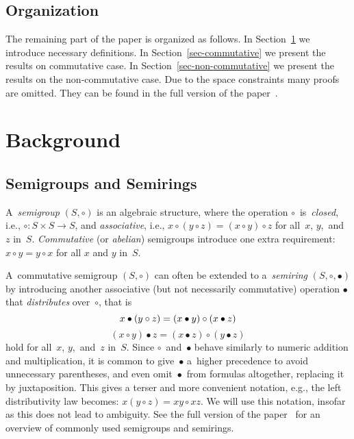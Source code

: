 \documentclass[review,onefignum,onetabnum]{siamart190516}
\begin{document}
\subsection{Organization}

The remaining part of the paper is organized as follows. In Section~\ref{sec:background} we introduce necessary definitions. In Section~\ref{sec-commutative} we present the results on commutative case. In Section~\ref{sec-non-commutative} we present the results on the non-commutative case. Due to the space constraints many proofs are omitted. They can be found in the full version of the
paper~\cite{DBLP:journals/eccc/KulikovMMP19}.


\section{Background} \label{sec:background}
\subsection{Semigroups and Semirings}
A~\emph{semigroup} $(S, \circ)$ is an algebraic structure, where
the operation
$\circ$~is~\emph{closed}, i.e., $\circ : S\times S \rightarrow S$,
and
\emph{associative}, i.e.,
$x \circ (y \circ z) = (x \circ y) \circ z$ for all~$x$, $y$,~and~$z$
in~$S$.
\emph{Commutative} (or \emph{abelian}) semigroups introduce
one extra requirement: $x \circ y = y \circ x$ for all $x$ and $y$
in~$S$.

A~commutative semigroup $(S, \circ)$ can often be extended to
a~\emph{semiring} $(S, \circ, \bullet)$ by introducing
another associative (but not necessarily
commutative)
operation $\bullet$ that \emph{distributes} over~$\circ$, that is
\[
x \bullet (y \circ z) = (x \bullet y) \circ (x \bullet z)\\
\]
\[
(x \circ y) \bullet z = (x \bullet z) \circ (y \bullet z)
\]
hold for all~$x$, $y$,~and~$z$ in~$S$.
Since $\circ$~and~$\bullet$ behave
similarly to numeric addition and multiplication, it is common to
give~$\bullet$ a~higher precedence to avoid
unnecessary parentheses, and even omit~$\bullet$~from
formulas altogether, replacing it by juxtaposition.
This gives a terser and
more convenient notation, e.g., the left distributivity law becomes:
$x (y \circ z) = x y \circ x z$. We will use this notation,
insofar as this does not lead to ambiguity. See
the full version of the paper~\cite{DBLP:journals/eccc/KulikovMMP19}
for an overview of commonly used
semigroups and semirings.
\end{document}
